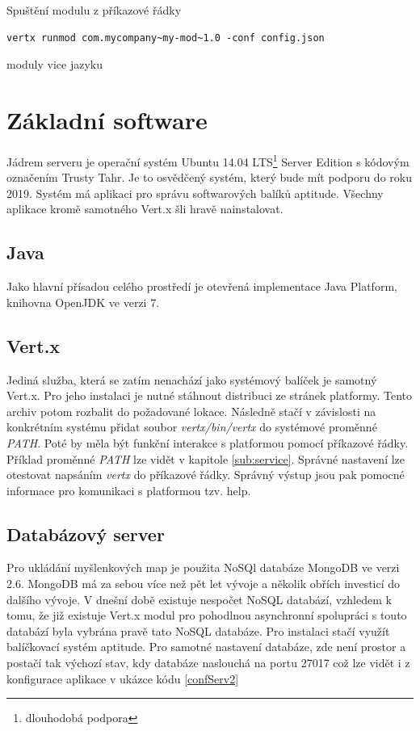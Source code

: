 Spuštění modulu z příkazové řádky
\begin{lstlisting}
vertx runmod com.mycompany~my-mod~1.0 -conf config.json
\end{lstlisting}

moduly vice jazyku

\section{Základní software}

Jádrem serveru je operační systém Ubuntu\cite{ubuntu} 14.04 LTS\footnote{dlouhodobá podpora} Server Edition s kódovým označením 
Trusty Tahr. Je to osvědčený systém, který bude mít podporu do roku 2019. Systém má aplikaci pro správu softwarových balíků 
aptitude. Všechny aplikace kromě samotného Vert.x šli hravě nainstalovat.

\subsection{Java}

Jako hlavní přísadou celého prostředí je otevřená implementace Java Platform, knihovna OpenJDK ve verzi 7.

\subsection{Vert.x}

Jediná služba, která se zatím nenachází jako systémový balíček je samotný Vert.x. Pro jeho instalaci je nutné stáhnout distribuci ze stránek platformy. Tento archiv potom rozbalit do požadované lokace. Následně stačí v závislosti na konkrétním systému přidat soubor \emph{vertx/bin/vertx} do systémové proměnné \emph{PATH}. Poté by měla být funkční interakce s platformou pomocí příkazové řádky. Příklad proměnné \emph{PATH} lze vidět v kapitole \ref{sub:service}. Správné nastavení lze otestovat napsáním \emph{vertx} do příkazové řádky. Správný výstup jsou pak pomocné informace pro komunikaci s platformou tzv. help.

\subsection{Databázový server}

Pro ukládání myšlenkových map je použita NoSQl databáze MongoDB ve verzi 2.6. MongoDB má za sebou více než pět let vývoje a několik obřích investicí\cite{mongodb} do dalšího vývoje. V dnešní době existuje nespočet NoSQL databází, vzhledem k tomu, že již existuje Vert.x modul pro pohodlnou asynchronní spolupráci s touto databází byla vybrána pravě tato NoSQL databáze. Pro instalaci stačí využít balíčkovací systém aptitude. Pro samotné nastavení databáze, zde není prostor a postačí tak výchozí stav, kdy databáze naslouchá na portu 27017 což lze vidět i z konfigurace aplikace v ukázce kódu \ref{confServ2}

